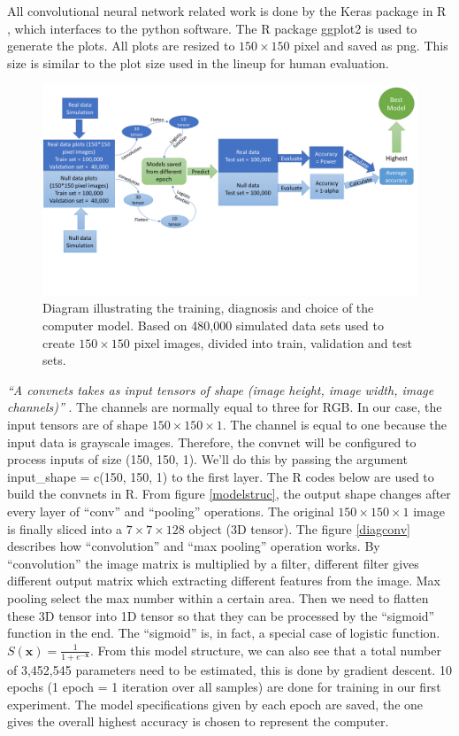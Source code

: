 \documentclass[12pt]{article}
\begin{document}
All convolutional neural network related work is done by the Keras
\citep{keras} package in R \citep{R}, which interfaces to the python
software. The R package ggplot2 \citep{ggplot2} is used to generate the
plots. All plots are resized to \(150\times 150\) pixel and saved as
png. This size is similar to the plot size used in the lineup for human
evaluation.

\begin{figure}[h]
\centerline{\includegraphics[width=15cm]{figures/diagpc.png}}
\caption{Diagram illustrating the training, diagnosis and choice of the computer model. Based on 480,000 simulated data sets used to create $150\times 150$ pixel images, divided into train, validation and test sets.}
\label{dgpc}
\end{figure}

\emph{``A convnets takes as input tensors of shape (image height, image
width, image channels)''} \citep{DLR18}. The channels are normally equal
to three for RGB. In our case, the input tensors are of shape
\(150 \times 150 \times 1\). The channel is equal to one because the
input data is grayscale images. Therefore, the convnet will be
configured to process inputs of size (150, 150, 1). We'll do this by
passing the argument input\_shape = c(150, 150, 1) to the first layer.
The R codes below are used to build the convnets in R. From figure
\ref{modelstruc}, the output shape changes after every layer of ``conv''
and ``pooling'' operations. The original \(150 \times 150 \times 1\)
image is finally sliced into a \(7 \times 7 \times 128\) object (3D
tensor). The figure \ref{diagconv} describes how ``convolution'' and
``max pooling'' operation works. By ``convolution'' the image matrix is
multiplied by a filter, different filter gives different output matrix
which extracting different features from the image. Max pooling select
the max number within a certain area. Then we need to flatten these 3D
tensor into 1D tensor so that they can be processed by the ``sigmoid''
function in the end. The ``sigmoid'' is, in fact, a special case of
logistic function. \(S(\textbf{x})=\frac{1}{1+e^{-\textbf{x}}}\). From
this model structure, we can also see that a total number of 3,452,545
parameters need to be estimated, this is done by gradient descent. 10
epochs (1 epoch = 1 iteration over all samples) are done for training in
our first experiment. The model specifications given by each epoch are
saved, the one gives the overall highest accuracy is chosen to represent
the computer.
\end{document}
